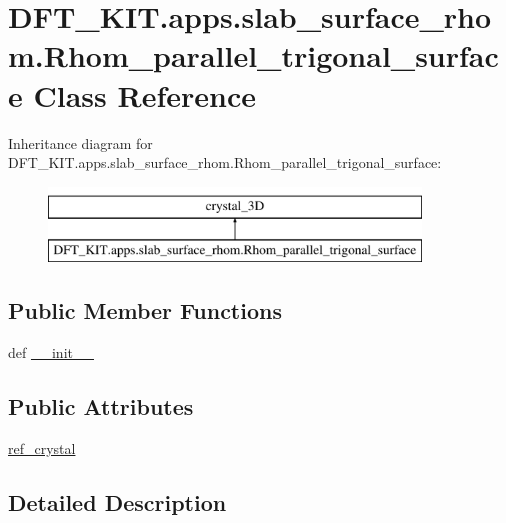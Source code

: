 \hypertarget{class_d_f_t___k_i_t_1_1apps_1_1slab__surface__rhom_1_1_rhom__parallel__trigonal__surface}{\section{D\+F\+T\+\_\+\+K\+I\+T.\+apps.\+slab\+\_\+surface\+\_\+rhom.\+Rhom\+\_\+parallel\+\_\+trigonal\+\_\+surface Class Reference}
\label{class_d_f_t___k_i_t_1_1apps_1_1slab__surface__rhom_1_1_rhom__parallel__trigonal__surface}
}
Inheritance diagram for D\+F\+T\+\_\+\+K\+I\+T.\+apps.\+slab\+\_\+surface\+\_\+rhom.\+Rhom\+\_\+parallel\+\_\+trigonal\+\_\+surface\+:\begin{figure}[H]
\begin{center}
\leavevmode
\includegraphics[height=2.000000cm]{class_d_f_t___k_i_t_1_1apps_1_1slab__surface__rhom_1_1_rhom__parallel__trigonal__surface}
\end{center}
\end{figure}
\subsection*{Public Member Functions}
\begin{DoxyCompactItemize}
\item 
def \hyperlink{class_d_f_t___k_i_t_1_1apps_1_1slab__surface__rhom_1_1_rhom__parallel__trigonal__surface_ab4aa2dd9eefafe4896d4b053ffc91bc2}{\+\_\+\+\_\+init\+\_\+\+\_\+}
\end{DoxyCompactItemize}
\subsection*{Public Attributes}
\begin{DoxyCompactItemize}
\item 
\hyperlink{class_d_f_t___k_i_t_1_1apps_1_1slab__surface__rhom_1_1_rhom__parallel__trigonal__surface_a42ef9900bdc7c47e6a52f6a5fed01e94}{ref\+\_\+crystal}
\end{DoxyCompactItemize}


\subsection{Detailed Description}


